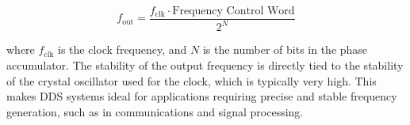 \[
f_{\text{out}} = \frac{f_{\text{clk}} \cdot \text{Frequency Control Word}}{2^N}
\]

where \( f_{\text{clk}} \) is the clock frequency, and \( N \) is the number of bits in the phase accumulator. The stability of the output frequency is directly tied to the stability of the crystal oscillator used for the clock, which is typically very high. This makes DDS systems ideal for applications requiring precise and stable frequency generation, such as in communications and signal processing.

